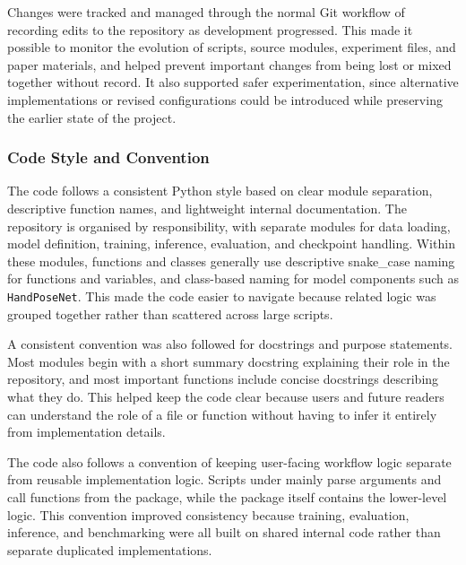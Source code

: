﻿\documentclass[11pt,a4paper]{article}
\begin{document}
\medskip

Changes were tracked and managed through the normal Git workflow of recording
edits to the repository as development progressed. This made it possible to
monitor the evolution of scripts, source modules, experiment files, and paper
materials, and helped prevent important changes from being lost or mixed
together without record.
It also supported safer experimentation, since alternative implementations or
revised configurations could be introduced while preserving the earlier state
of the project.

\subsubsection{Code Style and Convention}

The code follows a consistent Python style based on clear module separation,
descriptive function names, and lightweight internal documentation. The
repository is organised by responsibility, with separate modules for data
loading, model definition, training, inference, evaluation, and checkpoint
handling.
Within these modules, functions and classes generally use descriptive
snake\_case naming for functions and variables, and class-based naming for
model components such as \texttt{HandPoseNet}. This made the code easier to
navigate because related logic was grouped together rather than scattered
across large scripts.

\medskip

A consistent convention was also followed for docstrings and purpose
statements. Most modules begin with a short summary docstring explaining their
role in the repository, and most important functions include concise
docstrings describing what they do.
This helped keep the code clear because users and future readers can
understand the role of a file or function without having to infer it entirely
from implementation details.

\medskip

The code also follows a convention of keeping user-facing workflow logic
separate from reusable implementation logic. Scripts under 
mainly parse arguments and call functions from the 
package, while the package itself contains the lower-level logic.
This convention improved consistency because training, evaluation, inference,
and benchmarking were all built on shared internal code rather than separate
duplicated implementations.

\medskip
\end{document}
